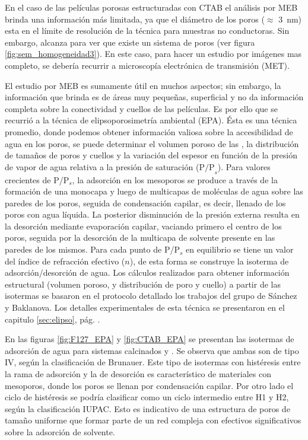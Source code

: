 		 En el caso de las películas porosas estructuradas con CTAB el análisis por MEB brinda una información más limitada, ya que el diámetro de los poros ($\approx$ \SI{3}{\nm}) esta en el límite de resolución de la técnica para muestras no conductoras. Sin embargo, alcanza para  ver que existe un sistema de poros (ver figura \ref{fig:sem_homogeneidad3}). En este caso, para hacer un estudio por imágenes mas completo, se debería recurrir a microscopía electrónica de transmisión (MET).

		 El estudio por MEB es sumamente útil en muchos aspectos; sin embargo, la información que brinda es de áreas muy pequeñas, superficial y no da información completa sobre la conectividad y cuellos de las películas. Es por ello que se recurrió a la técnica de elipsoporosimetría ambiental (EPA). Ésta es una técnica promedio, donde podemos obtener información valiosa sobre la accesibilidad de agua en los poros, se puede determinar el volumen poroso de las \pdm, la distribución de tamaños de poros y cuellos y la variación del espesor en función de la presión de vapor de agua relativa a la presión de saturación ($\text{P/P}_s$). Para valores crecientes de P/P$_s$, la adsorción en los mesoporos se produce a través de la formación de una monocapa y luego de multicapas de moléculas de agua sobre las paredes de los poros, seguida de condensación capilar, es decir, llenado de los poros con agua líquida. La posterior disminución de la presión externa resulta en la desorción mediante evaporación capilar, vaciando primero el centro de los poros, seguida por la desorción de la multicapa de solvente presente en las paredes de los mismos. Para cada punto de P/P$_s$ en equilibrio se tiene un valor del índice de refracción efectivo ($n$), de esta forma se construye la isoterma de adsorción/desorción de agua. Los cálculos realizados para obtener información estructural (volumen poroso, y distribución de poro y cuello) a partir de las isotermas se basaron en el protocolo detallado los trabajos del grupo de Sánchez y Baklanova\cite{Baklanov2000,Boissiere2005,Sakatani2006}. Los detalles experimentales de esta técnica se presentaron en el capitulo \ref{sec:elipso}, pág. \pageref{sec:elipso}.

		 \pagebreak

		 En las figuras \ref{fig:F127_EPA} y \ref{fig:CTAB_EPA} se presentan las isotermas de adsorción de agua para sistemas calcinados \pdmF\space y \pdmC. Se observa que ambas son de tipo IV, según la clasificación de Brunauer\cite{Gregg1967,Violi2015,Fuertes2010}. Este tipo de isotermas con histéresis entre la rama de adsorción y la de desorción es característico de materiales con mesoporos, donde los poros se llenan por condensación capilar. Por otro lado el ciclo de histéresis se podría clasificar como un ciclo intermedio entre H1 y H2, según la clasificación IUPAC\cite{Thommes2015}. Esto es indicativo de una estructura de poros de tamaño uniforme que formar parte de un red compleja con efectivos significativos sobre la adsorción de solvente.\cite{Thommes2015,Gregg1967,Lowell2004,Sing1985}

